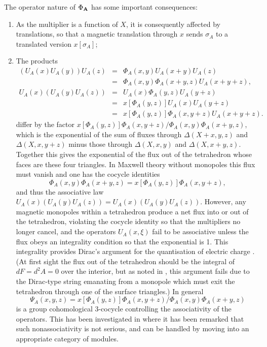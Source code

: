 \documentclass[11pt]{article}
\begin{document}
The operator nature of $\Phi_{\bf A}$ has some important consequences:
\begin{enumerate}
\item
As the multiplier is a function of $X$, it is consequently affected by translations, so that a magnetic translation through $x$ sends $\sigma_A$ to a translated version $x[\sigma_A]$;
\item
The products
\begin{eqnarray*}
\left(U_A(x)U_A(y)\right)U_A(z) &=& \Phi_A(x,y)U_A(x+y)U_A(z)\\
&=& \Phi_A(x,y)\Phi_A(x+y,z)U_A(x+y+z),\\
U_A(x)\left(U_A(y)U_A(z)\right) &=& U_A(x)\Phi_A(y,z)U_A(y+z)\\
&=& x[\Phi_A(y,z)]U_A(x)U_A(y+z)\\
&=& x[\Phi_A(y,z)]\Phi_A(x,y+z)U_A(x+y+z).
\end{eqnarray*}
differ by the factor $x[\Phi_A(y,z)]\Phi_A(x,y+z)/\Phi_A(x,y)\Phi_A(x+y,z)$, which is the exponential of the sum of fluxes through $\Delta(X+x,y,z)$ and $\Delta(X,x,y+z)$ minus those through $\Delta(X,x,y)$ and $\Delta(X,x+y,z)$. Together this gives the exponential of the flux out of the tetrahedron whose faces are these four triangles. 
In Maxwell theory without monopoles this flux must vanish and one has the cocycle identities
$$
\Phi_A(x,y)\Phi_A(x+y,z) = x[\Phi_A(y,z)]\Phi_A(x,y+z),
$$
and thus the associative law $U_A(x)\left(U_A(y)U_A(z)\right) = U_A(x)\left(U_A(y)U_A(z)\right)$.
However, any magnetic monopoles within a tetrahedron produce a net flux into or out of the tetrahedron, violating the cocycle identity so that the multipliers no longer cancel, and the operators $U_A(x,\xi)$ fail to be associative unless the flux obeys an integrality condition so that the exponential is 1. This integrality provides Dirac's argument for the quantisation of electric charge \cite{Di}. (At first sight the flux out of the tetrahedron should be the integral of $dF = d^2A = 0$ over the interior, but as noted in \cite{WZ}, this argument fails due to the Dirac-type string emanating from a monopole which must exit the tetrahedron through one of the surface triangles.)
In general  
$$
\Psi_A(x,y,z) = x[\Phi_A(y,z)]\Phi_A(x,y+z)/\Phi_A(x,y)\Phi_A(x+y,z)
$$
is  a group cohomological 3-cocycle \cite{WZ} controlling the associativity of the operators. This has been investigated in \cite{BHM06,BHM10} where it has been remarked that such nonassociativity is not serious, and can be handled by moving into an appropriate category of modules.
\end{enumerate} 
\end{document}
